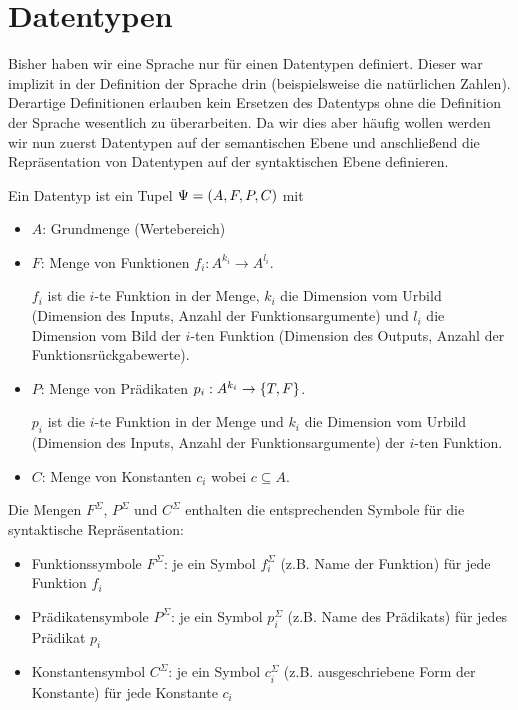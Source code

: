 \section{Datentypen}
Bisher haben wir eine Sprache nur für einen Datentypen definiert. Dieser war implizit in der
Definition der Sprache drin (beispielsweise die natürlichen Zahlen). Derartige Definitionen
erlauben kein Ersetzen des Datentyps ohne die Definition der Sprache wesentlich zu überarbeiten.
Da wir dies aber häufig wollen werden wir nun zuerst Datentypen auf der semantischen Ebene
und anschließend die Repräsentation von Datentypen auf der syntaktischen Ebene definieren.
\begin{defn}[Datentyp]
Ein Datentyp ist ein Tupel $\Psi=\left(A,F,P,C\right)$ mit
\begin{itemize}
\item $A$: Grundmenge (Wertebereich)
\item $F$: Menge von Funktionen $f_i: A^{k_i} \to A^{l_i}$.

$f_i$ ist die $i$-te Funktion in der Menge, $k_i$ die Dimension vom Urbild (Dimension des Inputs, Anzahl der Funktionsargumente) und $l_i$
die Dimension vom Bild der $i$-ten Funktion (Dimension des Outputs, Anzahl der Funktionsrückgabewerte).
\item $P$: Menge von Prädikaten $p_i: A^{k_i} \to \left\{T,F\right\}$.

$p_i$ ist die $i$-te Funktion in der Menge und $k_i$ die Dimension vom Urbild (Dimension des Inputs, Anzahl der Funktionsargumente) der $i$-ten Funktion.
\item $C$: Menge von Konstanten $c_i$ wobei $c \subseteq A$.
\end{itemize}
Die Mengen $F^{\Sigma}$, $P^{\Sigma}$ und $C^{\Sigma}$ enthalten die entsprechenden Symbole für die syntaktische Repräsentation:
\begin{itemize}
\item Funktionssymbole $F^{\Sigma}$: je ein Symbol $f^{\Sigma}_i$ (z.B. Name der Funktion) für jede Funktion $f_i$
\item Prädikatensymbole $P^{\Sigma}$: je ein Symbol $p^{\Sigma}_i$ (z.B. Name des Prädikats) für jedes Prädikat $p_i$
\item Konstantensymbol $C^{\Sigma}$: je ein Symbol $c^{\Sigma}_i$ (z.B. ausgeschriebene Form der Konstante) für jede Konstante $c_i$
\end{itemize}
\end{defn}

